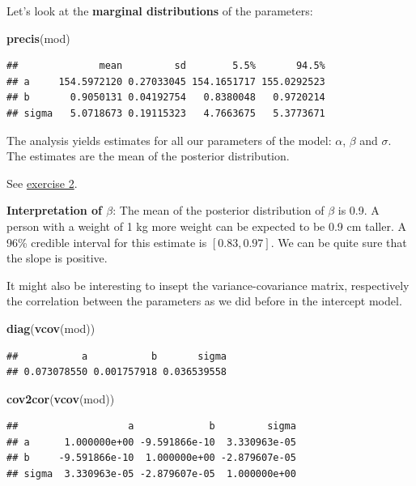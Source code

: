 \documentclass[
]{book}
\newenvironment{Shaded}{\begin{snugshade}}{\end{snugshade}}
\newcommand{\FunctionTok}[1]{\textcolor[rgb]{0.13,0.29,0.53}{\textbf{#1}}}
\newcommand{\NormalTok}[1]{#1}
\begin{document}
Let's look at the \textbf{marginal distributions} of the parameters:

\begin{Shaded}
\begin{Highlighting}[]
\FunctionTok{precis}\NormalTok{(mod)}
\end{Highlighting}
\end{Shaded}

\begin{verbatim}
##              mean         sd        5.5%       94.5%
## a     154.5972120 0.27033045 154.1651717 155.0292523
## b       0.9050131 0.04192754   0.8380048   0.9720214
## sigma   5.0718673 0.19115323   4.7663675   5.3773671
\end{verbatim}

The analysis yields estimates for all our parameters of the model: \(\alpha\),
\(\beta\) and \(\sigma\). The estimates are the mean of the posterior distribution.

See \hyperref[exercise2_simpl_lin_reg]{exercise 2}.

\textbf{Interpretation of \(\beta\)}:
The mean of the posterior distribution of \(\beta\) is 0.9. A person with a weight
of 1 kg more weight can be expected to be 0.9 cm taller. A 96\% credible interval
for this estimate is \([0.83, 0.97]\). We can be quite sure that the slope is
positive.

It might also be interesting to insept the variance-covariance matrix,
respectively the correlation between the parameters as we did before
in the intercept model.

\begin{Shaded}
\begin{Highlighting}[]
\FunctionTok{diag}\NormalTok{(}\FunctionTok{vcov}\NormalTok{(mod))}
\end{Highlighting}
\end{Shaded}

\begin{verbatim}
##           a           b       sigma 
## 0.073078550 0.001757918 0.036539558
\end{verbatim}

\begin{Shaded}
\begin{Highlighting}[]
\FunctionTok{cov2cor}\NormalTok{(}\FunctionTok{vcov}\NormalTok{(mod))}
\end{Highlighting}
\end{Shaded}

\begin{verbatim}
##                   a             b         sigma
## a      1.000000e+00 -9.591866e-10  3.330963e-05
## b     -9.591866e-10  1.000000e+00 -2.879607e-05
## sigma  3.330963e-05 -2.879607e-05  1.000000e+00
\end{verbatim}
\end{document}
